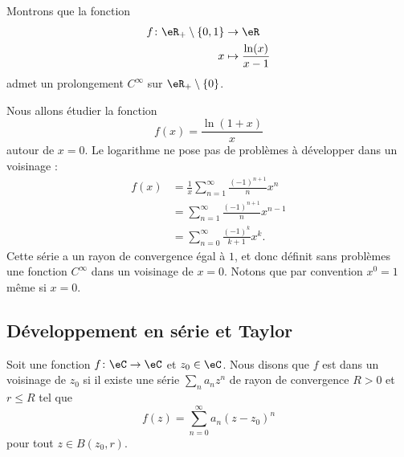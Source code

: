 \begin{example}
    Montrons que la fonction
    \begin{equation}
        \begin{aligned}
            f\colon \eR_+\setminus\{ 0,1 \}&\to \eR \\
            x&\mapsto \frac{ \ln(x) }{ x-1 } 
        \end{aligned}
    \end{equation}
    admet un prolongement \( C^{\infty}\) sur \( \eR_+\setminus\{ 0 \}\).

    Nous allons étudier la fonction
    \begin{equation}
        f(x)=\frac{ \ln(1+x) }{ x }
    \end{equation}
    autour de \( x=0\). Le logarithme ne pose pas de problèmes à développer dans un voisinage :
    \begin{subequations}
        \begin{align}
            f(x)&=\frac{1}{ x }\sum_{n=1}^{\infty}\frac{ (-1)^{n+1} }{ n }x^n\\
            &=\sum_{n=1}^{\infty}\frac{ (-1)^{n+1} }{ n }x^{n-1}\\
            &=\sum_{n=0}^{\infty}\frac{ (-1)^k }{ k+1 }x^k.
        \end{align}
    \end{subequations}
    Cette série a un rayon de convergence égal à \( 1\), et donc définit sans problèmes une fonction \( C^{\infty}\) dans un voisinage de \( x=0\). Notons que par convention \( x^0=1\) même si \( x=0\).
\end{example}

\subsection{Développement en série et Taylor}

Soit une fonction \( f\colon \eC\to \eC\) et \( z_0\in \eC\). Nous disons que \( f\) est  dans un voisinage de \( z_0\) si il existe une série \( \sum_n a_nz^n\) de rayon de convergence \( R>0\) et \( r\leq R\) tel que
\begin{equation}
    f(z)=\sum_{n=0}^{\infty}a_n(z-z_0)^n
\end{equation}
pour tout \( z\in B(z_0,r)\).


